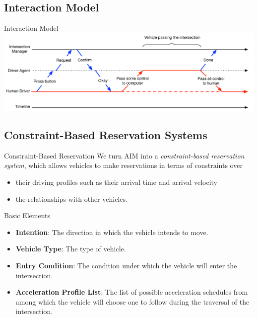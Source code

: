 \documentclass{beamer}
\begin{document}
\subsection{Interaction Model}

\begin{frame}{Interaction Model}
\includegraphics[width=\textwidth]{figures/interaction}
\end{frame}

\subsection{Constraint-Based Reservation Systems}

\begin{frame}{Constraint-Based Reservation}
We turn AIM into a \emph{constraint-based reservation system}, which
allows vehicles to make reservations in terms of constraints over
\begin{itemize}
\item their driving profiles such as their arrival time and arrival velocity
\item the relationships with other vehicles.
\end{itemize}
\end{frame}

\begin{frame}{Basic Elements}
\begin{itemize}
\item{\bf Intention}: The direction in which the vehicle intends to
move.\pause
\item{\bf Vehicle Type}: The type of vehicle.\pause
\item{\bf Entry Condition}: The condition under which the vehicle will
enter the intersection.\pause
\item{\bf Acceleration Profile List}: The list of possible
acceleration schedules from among which the vehicle will choose one to
follow during the traversal of the intersection.\pause
\end{itemize}
\end{frame}
\end{document}
